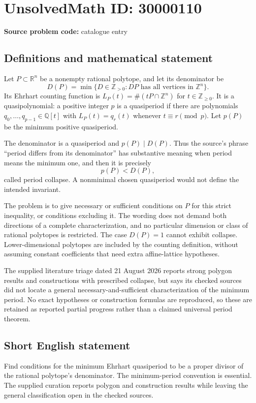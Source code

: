\documentclass[11pt]{article}
\newcommand{\Z}{\mathbb{Z}}
\newcommand{\Q}{\mathbb{Q}}
\newcommand{\R}{\mathbb{R}}
\begin{document}
\section*{UnsolvedMath ID: 30000110}
\textbf{Source problem code:} catalogue entry
\subsection{Definitions and mathematical statement}
Let \(P\subset\R^n\) be a nonempty rational polytope, and let its denominator be
\[
 D(P)=\min\{D\in\Z_{>0}:DP\text{ has all vertices in }\Z^n\}.
\]
Its Ehrhart counting function is \(L_P(t)=\#(tP\cap\Z^n)\) for \(t\in\Z_{\geq0}\). It is a quasipolynomial: a positive integer \(p\) is a quasiperiod if there are polynomials \(q_0,\ldots,q_{p-1}\in\Q[t]\) with \(L_P(t)=q_r(t)\) whenever \(t\equiv r\pmod p\). Let \(p(P)\) be the minimum positive quasiperiod.

The denominator is a quasiperiod and \(p(P)\mid D(P)\). Thus the source's phrase ``period differs from its denominator'' has substantive meaning when period means the minimum one, and then it is precisely
\[
 p(P)<D(P),
\]
called period collapse. A nonminimal chosen quasiperiod would not define the intended invariant.

The problem is to give necessary or sufficient conditions on \(P\) for this strict inequality, or conditions excluding it. The wording does not demand both directions of a complete characterization, and no particular dimension or class of rational polytopes is restricted. The case \(D(P)=1\) cannot exhibit collapse. Lower-dimensional polytopes are included by the counting definition, without assuming constant coefficients that need extra affine-lattice hypotheses.

The supplied literature triage dated 21 August 2026 reports strong polygon results and constructions with prescribed collapse, but says its checked sources did not locate a general necessary-and-sufficient characterization of the minimum period. No exact hypotheses or construction formulas are reproduced, so these are retained as reported partial progress rather than a claimed universal period theorem.
\subsection{Short English statement}
Find conditions for the minimum Ehrhart quasiperiod to be a proper divisor of the rational polytope's denominator. The minimum-period convention is essential. The supplied curation reports polygon and construction results while leaving the general classification open in the checked sources.
\end{document}
